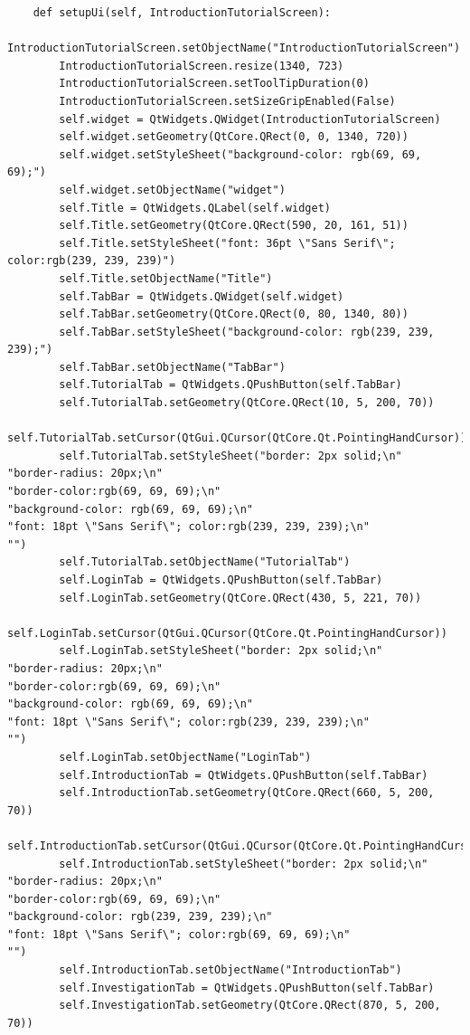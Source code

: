 \documentclass[12pt]{article}
\begin{document}
\begin{lstlisting}
    def setupUi(self, IntroductionTutorialScreen):
        IntroductionTutorialScreen.setObjectName("IntroductionTutorialScreen")
        IntroductionTutorialScreen.resize(1340, 723)
        IntroductionTutorialScreen.setToolTipDuration(0)
        IntroductionTutorialScreen.setSizeGripEnabled(False)
        self.widget = QtWidgets.QWidget(IntroductionTutorialScreen)
        self.widget.setGeometry(QtCore.QRect(0, 0, 1340, 720))
        self.widget.setStyleSheet("background-color: rgb(69, 69, 69);")
        self.widget.setObjectName("widget")
        self.Title = QtWidgets.QLabel(self.widget)
        self.Title.setGeometry(QtCore.QRect(590, 20, 161, 51))
        self.Title.setStyleSheet("font: 36pt \"Sans Serif\"; color:rgb(239, 239, 239)")
        self.Title.setObjectName("Title")
        self.TabBar = QtWidgets.QWidget(self.widget)
        self.TabBar.setGeometry(QtCore.QRect(0, 80, 1340, 80))
        self.TabBar.setStyleSheet("background-color: rgb(239, 239, 239);")
        self.TabBar.setObjectName("TabBar")
        self.TutorialTab = QtWidgets.QPushButton(self.TabBar)
        self.TutorialTab.setGeometry(QtCore.QRect(10, 5, 200, 70))
        self.TutorialTab.setCursor(QtGui.QCursor(QtCore.Qt.PointingHandCursor))
        self.TutorialTab.setStyleSheet("border: 2px solid;\n"
"border-radius: 20px;\n"
"border-color:rgb(69, 69, 69);\n"
"background-color: rgb(69, 69, 69);\n"
"font: 18pt \"Sans Serif\"; color:rgb(239, 239, 239);\n"
"")
        self.TutorialTab.setObjectName("TutorialTab")
        self.LoginTab = QtWidgets.QPushButton(self.TabBar)
        self.LoginTab.setGeometry(QtCore.QRect(430, 5, 221, 70))
        self.LoginTab.setCursor(QtGui.QCursor(QtCore.Qt.PointingHandCursor))
        self.LoginTab.setStyleSheet("border: 2px solid;\n"
"border-radius: 20px;\n"
"border-color:rgb(69, 69, 69);\n"
"background-color: rgb(69, 69, 69);\n"
"font: 18pt \"Sans Serif\"; color:rgb(239, 239, 239);\n"
"")
        self.LoginTab.setObjectName("LoginTab")
        self.IntroductionTab = QtWidgets.QPushButton(self.TabBar)
        self.IntroductionTab.setGeometry(QtCore.QRect(660, 5, 200, 70))
        self.IntroductionTab.setCursor(QtGui.QCursor(QtCore.Qt.PointingHandCursor))
        self.IntroductionTab.setStyleSheet("border: 2px solid;\n"
"border-radius: 20px;\n"
"border-color:rgb(69, 69, 69);\n"
"background-color: rgb(239, 239, 239);\n"
"font: 18pt \"Sans Serif\"; color:rgb(69, 69, 69);\n"
"")
        self.IntroductionTab.setObjectName("IntroductionTab")
        self.InvestigationTab = QtWidgets.QPushButton(self.TabBar)
        self.InvestigationTab.setGeometry(QtCore.QRect(870, 5, 200, 70))

\end{lstlisting}
\end{document}
